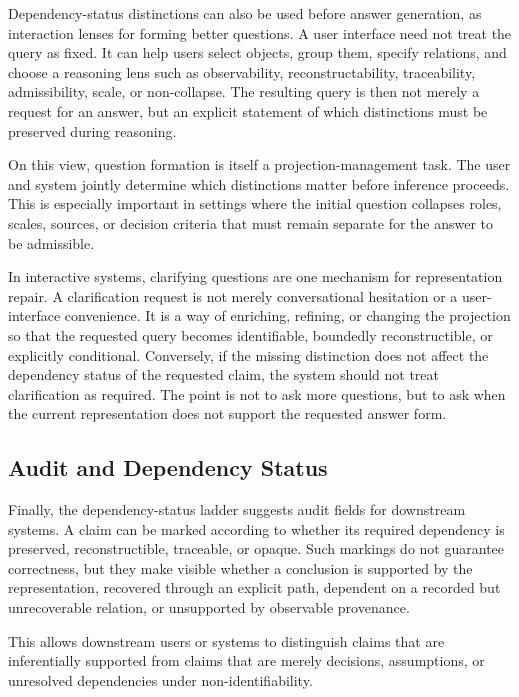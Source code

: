 \documentclass[11pt]{article}
\begin{document}
Dependency-status distinctions can also be used before answer generation, as interaction lenses for forming better questions. A user interface need not treat the query as fixed. It can help users select objects, group them, specify relations, and choose a reasoning lens such as observability, reconstructability, traceability, admissibility, scale, or non-collapse. The resulting query is then not merely a request for an answer, but an explicit statement of which distinctions must be preserved during reasoning.

On this view, question formation is itself a projection-management task. The user and system jointly determine which distinctions matter before inference proceeds. This is especially important in settings where the initial question collapses roles, scales, sources, or decision criteria that must remain separate for the answer to be admissible.

In interactive systems, clarifying questions are one mechanism for representation repair. A clarification request is not merely conversational hesitation or a user-interface convenience. It is a way of enriching, refining, or changing the projection so that the requested query becomes identifiable, boundedly reconstructible, or explicitly conditional. Conversely, if the missing distinction does not affect the dependency status of the requested claim, the system should not treat clarification as required. The point is not to ask more questions, but to ask when the current representation does not support the requested answer form.

\subsection{Audit and Dependency Status}

Finally, the dependency-status ladder suggests audit fields for downstream systems. A claim can be marked according to whether its required dependency is preserved, reconstructible, traceable, or opaque. Such markings do not guarantee correctness, but they make visible whether a conclusion is supported by the representation, recovered through an explicit path, dependent on a recorded but unrecoverable relation, or unsupported by observable provenance.

This allows downstream users or systems to distinguish claims that are inferentially supported from claims that are merely decisions, assumptions, or unresolved dependencies under non-identifiability.
\end{document}
